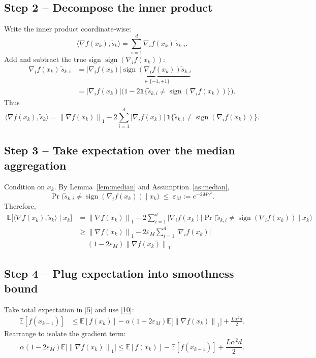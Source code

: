 \documentclass{article}
\newcommand{\sign}{\operatorname{sign}}
\newcommand{\E}{\mathbb{E}}
\newcommand{\norm}[1]{\left\lVert#1\right\rVert}
\begin{document}
\subsection*{Step 2 – Decompose the inner product}
Write the inner product coordinate‑wise:
\[
\langle\nabla f(x_{k}),\tilde{s}_{k}\rangle
=\sum_{i=1}^{d}\nabla_{i}f(x_{k})\,\tilde{s}_{k,i}.
\tag{6}
\]
Add and subtract the true sign $\sign(\nabla_{i}f(x_{k}))$:
\begin{align}
\nabla_{i}f(x_{k})\,\tilde{s}_{k,i}
&=|\nabla_{i}f(x_{k})|
   \underbrace{\sign(\nabla_{i}f(x_{k}))\tilde{s}_{k,i}}_{\in\{-1,+1\}} \nonumber\\
&=|\nabla_{i}f(x_{k})|
   \bigl(1-2\mathbf{1}\{\tilde{s}_{k,i}\neq\sign(\nabla_{i}f(x_{k}))\}\bigr).
\tag{7}
\end{align}
Thus
\[
\langle\nabla f(x_{k}),\tilde{s}_{k}\rangle
= \norm{\nabla f(x_{k})}_{1}
   -2\sum_{i=1}^{d} |\nabla_{i}f(x_{k})|
      \,\mathbf{1}\{\tilde{s}_{k,i}\neq\sign(\nabla_{i}f(x_{k}))\}.
\tag{8}
\]

\subsection*{Step 3 – Take expectation over the median aggregation}
Condition on $x_{k}$.  By Lemma~\ref{lem:median} and Assumption~\ref{as:median},
\[
\Pr\bigl(\tilde{s}_{k,i}\neq\sign(\nabla_{i}f(x_{k}))\mid x_{k}\bigr)
\;\le\; \varepsilon_{M}:=e^{-2M\gamma^{2}}.
\tag{9}
\]
Therefore,
\begin{align}
\E\bigl[\langle\nabla f(x_{k}),\tilde{s}_{k}\rangle\mid x_{k}\bigr]
&= \norm{\nabla f(x_{k})}_{1}
   -2\sum_{i=1}^{d} |\nabla_{i}f(x_{k})|
      \Pr\bigl(\tilde{s}_{k,i}\neq\sign(\nabla_{i}f(x_{k}))\mid x_{k}\bigr) \nonumber\\
&\ge \norm{\nabla f(x_{k})}_{1}
   -2\varepsilon_{M}\sum_{i=1}^{d} |\nabla_{i}f(x_{k})|
   \nonumber\\
&= (1-2\varepsilon_{M})\norm{\nabla f(x_{k})}_{1}.
\tag{10}
\end{align}

\subsection*{Step 4 – Plug expectation into smoothness bound}
Take total expectation in \eqref{5} and use \eqref{10}:
\begin{align}
\E[f(x_{k+1})]
&\le \E[f(x_{k})]
   -\alpha (1-2\varepsilon_{M})\E\!\bigl[\norm{\nabla f(x_{k})}_{1}\bigr]
   +\frac{L\alpha^{2}d}{2}.
\tag{11}
\end{align}
Rearrange to isolate the gradient term:
\[
\alpha (1-2\varepsilon_{M})\E\!\bigl[\norm{\nabla f(x_{k})}_{1}\bigr]
\le \E[f(x_{k})]-\E[f(x_{k+1})]+\frac{L\alpha^{2}d}{2}.
\tag{12}
\]
\end{document}
